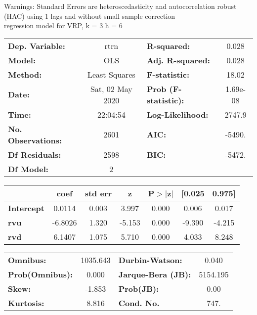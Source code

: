 Warnings: \newline
 [1] Standard Errors are heteroscedasticity and autocorrelation robust (HAC) using 1 lags and without small sample correction\\ 

regression model for VRP, k = 3 h = 6\begin{center}
\begin{tabular}{lclc}
\toprule
\textbf{Dep. Variable:}    &       rtrn       & \textbf{  R-squared:         } &     0.028   \\
\textbf{Model:}            &       OLS        & \textbf{  Adj. R-squared:    } &     0.028   \\
\textbf{Method:}           &  Least Squares   & \textbf{  F-statistic:       } &     18.02   \\
\textbf{Date:}             & Sat, 02 May 2020 & \textbf{  Prob (F-statistic):} &  1.69e-08   \\
\textbf{Time:}             &     22:04:54     & \textbf{  Log-Likelihood:    } &    2747.9   \\
\textbf{No. Observations:} &        2601      & \textbf{  AIC:               } &    -5490.   \\
\textbf{Df Residuals:}     &        2598      & \textbf{  BIC:               } &    -5472.   \\
\textbf{Df Model:}         &           2      & \textbf{                     } &             \\
\bottomrule
\end{tabular}
\begin{tabular}{lcccccc}
                   & \textbf{coef} & \textbf{std err} & \textbf{z} & \textbf{P$> |$z$|$} & \textbf{[0.025} & \textbf{0.975]}  \\
\midrule
\textbf{Intercept} &       0.0114  &        0.003     &     3.997  &         0.000        &        0.006    &        0.017     \\
\textbf{rvu}       &      -6.8026  &        1.320     &    -5.153  &         0.000        &       -9.390    &       -4.215     \\
\textbf{rvd}       &       6.1407  &        1.075     &     5.710  &         0.000        &        4.033    &        8.248     \\
\bottomrule
\end{tabular}
\begin{tabular}{lclc}
\textbf{Omnibus:}       & 1035.643 & \textbf{  Durbin-Watson:     } &    0.040  \\
\textbf{Prob(Omnibus):} &   0.000  & \textbf{  Jarque-Bera (JB):  } & 5154.195  \\
\textbf{Skew:}          &  -1.853  & \textbf{  Prob(JB):          } &     0.00  \\
\textbf{Kurtosis:}      &   8.816  & \textbf{  Cond. No.          } &     747.  \\
\bottomrule
\end{tabular}
\end{center}

